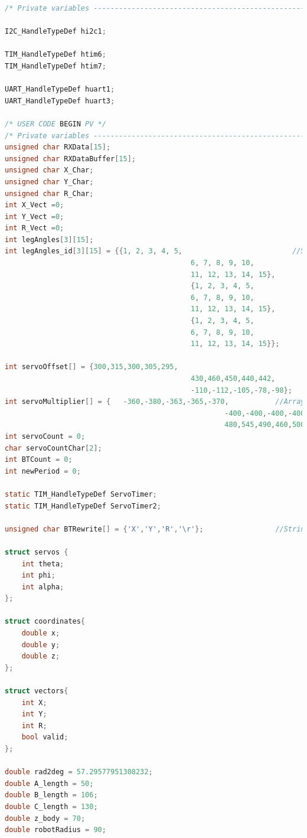 \begin{lstlisting}[language = c]
/* Private variables ---------------------------------------------------------*/

I2C_HandleTypeDef hi2c1;

TIM_HandleTypeDef htim6;
TIM_HandleTypeDef htim7;

UART_HandleTypeDef huart1;
UART_HandleTypeDef huart3;

/* USER CODE BEGIN PV */
/* Private variables ---------------------------------------------------------*/
unsigned char RXData[15];																//Array for Bluetooth reception
unsigned char RXDataBuffer[15];													//Temp buffer for above
unsigned char X_Char;																		//Stores received X as Char
unsigned char Y_Char;																		//Stores received Y as Char
unsigned char R_Char;																		//Stores received R as Char
int X_Vect =0;																					//Stores received X as Int
int Y_Vect =0;																					//Stores received Y as Int
int R_Vect =0;																					//Stores received R as Int
int legAngles[3][15];																		//Stores the desired angle for each limb
int legAngles_id[3][15] = {{1, 2, 3, 4, 5,							//Stores the ID of each limb for sorting
											6, 7, 8, 9, 10,
											11, 12, 13, 14, 15},
											{1, 2, 3, 4, 5,										
											6, 7, 8, 9, 10,
											11, 12, 13, 14, 15},
											{1, 2, 3, 4, 5,										
											6, 7, 8, 9, 10,
											11, 12, 13, 14, 15}};

int servoOffset[] = {300,315,300,305,295,								//Array for storing the offset of each servo
											430,460,450,440,442,
											-110,-112,-105,-78,-98};		
int servoMultiplier[] = {	-360,-380,-363,-365,-370,			//Array for storing the multiplier of each servo
													-400,-400,-400,-400,-400,
													480,545,490,460,500};		
int servoCount = 0;																			//Counter used for keeping track of servo interrupts
char servoCountChar[2];
int BTCount = 0;																				//Counter for BlueTooth LED
int newPeriod = 0;

static TIM_HandleTypeDef ServoTimer;
static TIM_HandleTypeDef ServoTimer2;

unsigned char BTRewrite[] = {'X','Y','R','\r'};					//String used for debugging

struct servos {
	int theta;
	int phi;
	int alpha;
};

struct coordinates{
	double x;
	double y;
	double z;
};

struct vectors{
	int X;
	int Y;
	int R;
	bool valid;
};

double rad2deg = 57.29577951308232;
double A_length = 50;
double B_length = 106;
double C_length = 130;
double z_body = 70;
double robotRadius = 90;   


\end{lstlisting}
